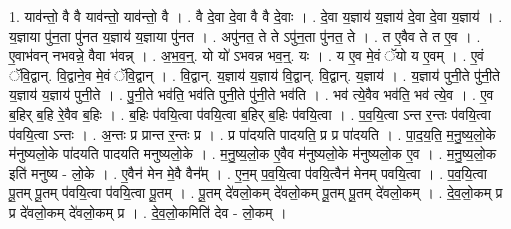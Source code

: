 \documentclass[17pt]{extarticle}
\begin{document}
1. याव॑न्तो॒ वै वै याव॑न्तो॒ याव॑न्तो॒ वै । . वै दे॒वा दे॒वा वै वै दे॒वाः । . दे॒वा य॒ज्ञाय॑ य॒ज्ञाय॑ दे॒वा दे॒वा य॒ज्ञाय॑ । . य॒ज्ञाया पु॑न॒ता पु॑नत य॒ज्ञाय॑ य॒ज्ञाया पु॑नत । . अपु॑नत॒ ते ते ऽपु॑न॒ता पु॑नत॒ ते । . त ए॒वैव ते त ए॒व । . ए॒वाभ॑वन् नभवन्ने॒ वैवा भ॑वन्न् । . अ॒भ॒व॒न्॒. यो यो॑ ऽभवन्न भव॒न्॒. यः । . य ए॒व मे॒वं ॅयो य ए॒वम् । . ए॒वं ॅवि॒द्वान्. वि॒द्वाने॒व मे॒वं ॅवि॒द्वान् । . वि॒द्वान्. य॒ज्ञाय॑ य॒ज्ञाय॑ वि॒द्वान्. वि॒द्वान्. य॒ज्ञाय॑ । . य॒ज्ञाय॑ पुनी॒ते पु॑नी॒ते य॒ज्ञाय॑ य॒ज्ञाय॑ पुनी॒ते । . पु॒नी॒ते भव॑ति॒ भव॑ति पुनी॒ते पु॑नी॒ते भव॑ति । . भव॑ त्ये॒वैव भव॑ति॒ भव॑ त्ये॒व । . ए॒व ब॒हिर् ब॒हि रे॒वैव ब॒हिः । . ब॒हिः प॑वयि॒त्वा प॑वयि॒त्वा ब॒हिर् ब॒हिः प॑वयि॒त्वा । . प॒व॒यि॒त्वा ऽन्त र॒न्तः प॑वयि॒त्वा प॑वयि॒त्वा ऽन्तः । . अ॒न्तः प्र प्रान्त र॒न्तः प्र । . प्र पा॑दयति पादयति॒ प्र प्र पा॑दयति । . पा॒द॒य॒ति॒ म॒नु॒ष्य॒लो॒के म॑नुष्यलो॒के पा॑दयति पादयति मनुष्यलो॒के । . म॒नु॒ष्य॒लो॒क ए॒वैव म॑नुष्यलो॒के म॑नुष्यलो॒क ए॒व । . म॒नु॒ष्य॒लो॒क इति॑ मनुष्य - लो॒के । . ए॒वैन॑ मेन मे॒वै वैन᳚म् । . ए॒न॒म् प॒व॒यि॒त्वा प॑वयि॒त्वैन॑ मेनम् पवयि॒त्वा । . प॒व॒यि॒त्वा पू॒तम् पू॒तम् प॑वयि॒त्वा प॑वयि॒त्वा पू॒तम् । . पू॒तम् दे॑वलो॒कम् दे॑वलो॒कम् पू॒तम् पू॒तम् दे॑वलो॒कम् । . दे॒व॒लो॒कम् प्र प्र दे॑वलो॒कम् दे॑वलो॒कम् प्र । . दे॒व॒लो॒कमिति॑ देव - लो॒कम् । \newline
\end{document}
